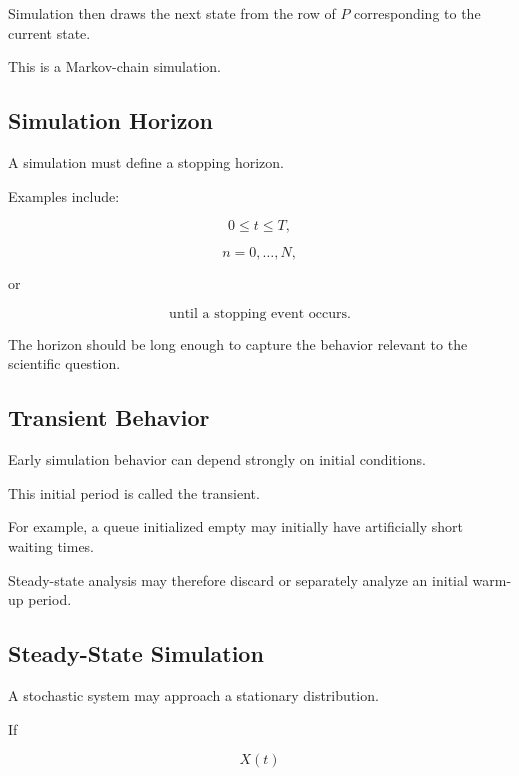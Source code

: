 Simulation then draws the next state from the row of \(P\) corresponding
to the current state.

This is a Markov-chain simulation.

\subsection{Simulation Horizon}
\label{subsec:simulation-horizon}

A simulation must define a stopping horizon.

Examples include:

\[
\boxed{
0\leq t\leq T,
}
\]

\[
\boxed{
n=0,\ldots,N,
}
\]

or

\[
\boxed{
\text{until a stopping event occurs}.
}
\]

The horizon should be long enough to capture the behavior relevant to the
scientific question.

\subsection{Transient Behavior}
\label{subsec:simulation-transient-behavior}

Early simulation behavior can depend strongly on initial conditions.

This initial period is called the transient.

For example, a queue initialized empty may initially have artificially
short waiting times.

Steady-state analysis may therefore discard or separately analyze an
initial warm-up period.

\subsection{Steady-State Simulation}
\label{subsec:steady-state-simulation}

A stochastic system may approach a stationary distribution.

If

\[
X(t)
\]


